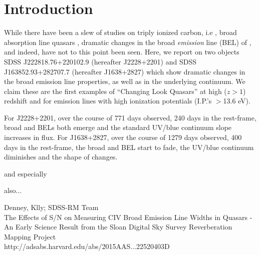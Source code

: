 \documentclass[a4paper,fleqn,usenatbib]{mnras}
\begin{document}
\section{Introduction}
While there have been a slew of studies on triply ionized carbon, i.e \civ, broad absorption line quasars \citep[BAL QSOs; see e.g. Table 1][]{Hemler2019}, dramatic changes in the broad {\it emission} line (BEL) of \civ, and indeed, \ciii have not to this point been seen. Here, we report on two objects SDSS J222818.76+220102.9 (hereafter J2228+2201) and SDSS J163852.93+282707.7 (hereafter J1638+2827) which show dramatic changes in the \civ broad emission line properties, as well as in the underlying continuum. We claim these are the first examples of ``Changing Look Quasars'' at high ($z>1$) redshift and for emission lines with high ionization potentials (I.P.'s $>$13.6 eV). 

For J2228+2201, over the course of 771 days observed, 240 days in the rest-frame, broad \civ and \ciii BELs both emerge and the standard UV/blue continuum slope increases in flux. For J1638+2827, over the course of 1279 days observed, 400 days in the rest-frame, the  broad \civ and \ciii BEL start to fade, the UV/blue continuum diminishes and the shape of \lya changes. 






\citet{Wilhite2005} and especially \citet{Wilhite2006} 

\citet{Wilhite2008} also...

Denney, Klly; SDSS-RM Team \\
The Effects of S/N on Measuring CIV Broad Emission Line Widths in Quasars - An Early Science Result from the Sloan Digital Sky Survey Reverberation Mapping Project\\
http://adsabs.harvard.edu/abs/2015AAS...22520403D\\
\end{document}
